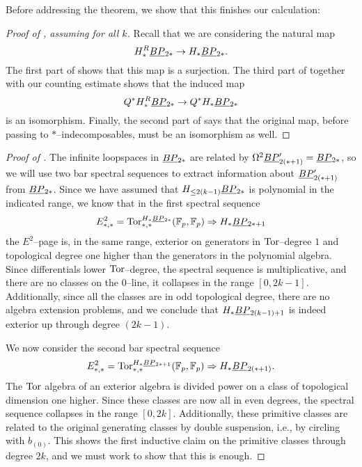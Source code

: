 Before addressing the theorem, we show that this finishes our calculation:
\begin{proof}[{Proof of , assuming  for all $k$}]
Recall that we are considering the natural map \[H_*^R \smash{\underline{BP}}_{2*} \to H_* \smash{\underline{BP}}_{2*}.\]  The first part of  shows that this map is a surjection.  The third part of  together with our counting estimate shows that the induced map \[Q^* H_*^R \smash{\underline{BP}}_{2*} \to Q^* H_* \smash{\underline{BP}}_{2*}\] is an isomorphism.  Finally, the second part of  says that the original map, before passing to $\ast$--indecomposables, must be an isomorphism as well.
\end{proof}

\begin{proof}[{Proof of }]
The infinite loopspaces in $\smash{\underline{BP}}_{2*}$ are related by $\Omega^2 \smash{\underline{BP}}_{2(*+1)}' = \smash{\underline{BP}}_{2*}$, so we will use two bar spectral sequences to extract information about $\smash{\underline{BP}}_{2(*+1)}'$ from $\smash{\underline{BP}}_{2*}$.  Since we have assumed that $H_{\le 2(k-1)} \smash{\underline{BP}}_{2*}$ is polynomial in the indicated range, we know that in the first spectral sequence \[E^2_{*, *} = \operatorname{Tor}^{H_* \smash{\underline{BP}}_{2*}}_{*, *}(\mathbb F_p, \mathbb F_p) \Rightarrow H_* \smash{\underline{BP}}_{2*+1}\] the $E^2$--page is, in the same range, exterior on generators in $\operatorname{Tor}$--degree $1$ and topological degree one higher than the generators in the polynomial algebra.  Since differentials lower $\operatorname{Tor}$--degree, the spectral sequence is multiplicative, and there are no classes on the $0$--line, it collapses in the range $[0, 2k-1]$.  Additionally, since all the classes are in odd topological degree, there are no algebra extension problems, and we conclude that $H_* \smash{\underline{BP}}_{2(k-1)+1}$ is indeed exterior up through degree $(2k-1)$.

We now consider the second bar spectral sequence \[E^2_{*, *} = \operatorname{Tor}^{H_* \smash{\underline{BP}}_{2*+1}}_{*, *}(\mathbb F_p, \mathbb F_p) \Rightarrow H_* \smash{\underline{BP}}_{2(*+1)}.\]  The $\operatorname{Tor}$ algebra of an exterior algebra is divided power on a class of topological dimension one higher.  Since these classes are now all in even degrees, the spectral sequence collapses in the range $[0, 2k]$.  Additionally, these primitive classes are related to the original generating classes by double suspension, i.e., by circling with $b_{(0)}$.  This shows the first inductive claim on the primitive classes through degree $2k$, and we must work to show that this is enough.

\end{proof}

